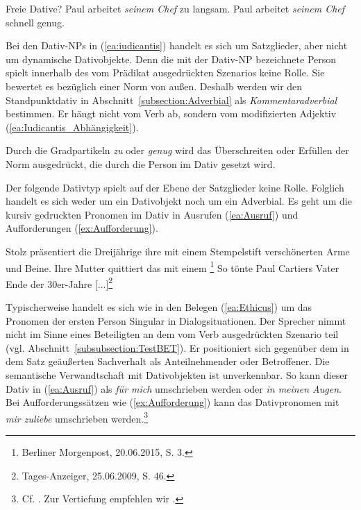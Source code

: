 \begin{Exkurs}{Freie Dative?}
\ea \label{ea:iudicantis}
\ea \label{ea:mirzuviel} Paul arbeitet \textit{seinem Chef} zu langsam.
\ex \label{ex:mirgutgenug} Paul arbeitet \textit{seinem Chef} schnell genug.
\z 
\z 

Bei den Dativ-NPs in (\ref{ea:iudicantis}) handelt es sich um Satzglieder, aber nicht um dynamische Dativobjekte. Denn die mit der Dativ-NP bezeichnete Person spielt innerhalb des vom Prädikat ausgedrückten Szenarios keine Rolle. Sie bewertet es bezüglich einer Norm von außen. Deshalb werden wir den Standpunktdativ in Abschnitt~\ref{subsection:Adverbial} als \textit{Kommentaradverbial} bestimmen. Er hängt nicht vom Verb ab, sondern vom modifizierten Adjektiv (\ref{ea:Iudicantis_Abhängigkeit}).

\ea \label{ea:Iudicantis_Abhängigkeit}
\label{ea:*Iudicantis_V}
\label{ex:*Iudicantis_Adv}
\z 
\z 

Durch die Gradpartikeln \textit{zu} oder \textit{genug} wird das Überschreiten oder Erfüllen der Norm ausgedrückt, die durch die Person im Dativ gesetzt wird.

Der folgende Dativtyp spielt auf der Ebene der Satzglieder keine Rolle. Folglich handelt es sich weder um ein Dativobjekt noch um ein Adverbial. Es geht um die kursiv gedruckten Pronomen im Dativ in Ausrufen (\ref{ea:Ausruf}) und Aufforderungen (\ref{ex:Aufforderung}). 

\ea \label{ea:Ethicus}
\ea \label{ea:Ausruf} Stolz präsentiert die Dreijährige ihre mit einem Stempelstift verschönerten Arme und Beine. Ihre Mutter quittiert das mit einem \footnote{Berliner Morgenpost, 20.06.2015, S. 3.}
\ex \label{ex:Aufforderung}  So tönte Paul Cartiers Vater Ende der 30er-Jahre [...]\footnote{Tages-Anzeiger, 25.06.2009, S. 46.}
\z 
\z 

Typischerweise handelt es sich wie in den Belegen (\ref{ea:Ethicus}) um das Pronomen der ersten Person Singular in Dialogsituationen. Der Sprecher nimmt nicht im Sinne eines Beteiligten an dem vom Verb ausgedrückten Szenario teil (vgl. Abschnitt~\ref{subsubsection:TestBET}). Er positioniert sich gegenüber dem in dem Satz geäußerten Sachverhalt als Anteilnehmender oder Betroffener. Die semantische Verwandtschaft mit Dativobjekten ist unverkennbar. So kann dieser Dativ in (\ref{ea:Ausruf}) als \textit{für mich} umschrieben werden oder \textit{in meinen Augen}. Bei Aufforderungssätzen wie (\ref{ex:Aufforderung}) kann das Dativpronomen mit \textit{mir zuliebe} umschrieben werden.\footnote{Cf. \citet[53]{Wegener1985}. Zur Vertiefung empfehlen wir \citet[124--155]{Ogawa2003}.} 


\end{Exkurs}
